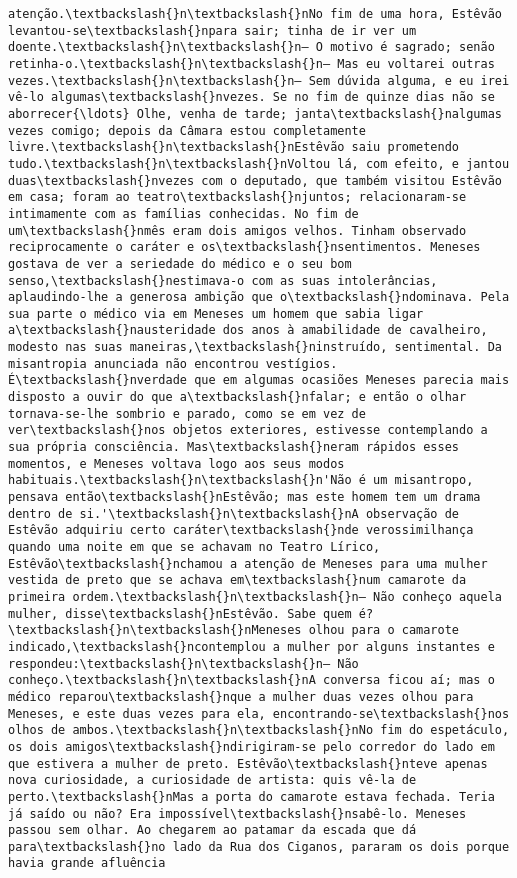 \documentclass[11pt]{article}
\begin{document}
\begin{Verbatim}[commandchars=\\\{\}]
atenção.\textbackslash{}n\textbackslash{}nNo fim de uma hora, Estêvão levantou-se\textbackslash{}npara sair; tinha de ir ver um doente.\textbackslash{}n\textbackslash{}n— O motivo é sagrado; senão retinha-o.\textbackslash{}n\textbackslash{}n— Mas eu voltarei outras vezes.\textbackslash{}n\textbackslash{}n— Sem dúvida alguma, e eu irei vê-lo algumas\textbackslash{}nvezes. Se no fim de quinze dias não se aborrecer{\ldots} Olhe, venha de tarde; janta\textbackslash{}nalgumas vezes comigo; depois da Câmara estou completamente livre.\textbackslash{}n\textbackslash{}nEstêvão saiu prometendo tudo.\textbackslash{}n\textbackslash{}nVoltou lá, com efeito, e jantou duas\textbackslash{}nvezes com o deputado, que também visitou Estêvão em casa; foram ao teatro\textbackslash{}njuntos; relacionaram-se intimamente com as famílias conhecidas. No fim de um\textbackslash{}nmês eram dois amigos velhos. Tinham observado reciprocamente o caráter e os\textbackslash{}nsentimentos. Meneses gostava de ver a seriedade do médico e o seu bom senso,\textbackslash{}nestimava-o com as suas intolerâncias, aplaudindo-lhe a generosa ambição que o\textbackslash{}ndominava. Pela sua parte o médico via em Meneses um homem que sabia ligar a\textbackslash{}nausteridade dos anos à amabilidade de cavalheiro, modesto nas suas maneiras,\textbackslash{}ninstruído, sentimental. Da misantropia anunciada não encontrou vestígios. É\textbackslash{}nverdade que em algumas ocasiões Meneses parecia mais disposto a ouvir do que a\textbackslash{}nfalar; e então o olhar tornava-se-lhe sombrio e parado, como se em vez de ver\textbackslash{}nos objetos exteriores, estivesse contemplando a sua própria consciência. Mas\textbackslash{}neram rápidos esses momentos, e Meneses voltava logo aos seus modos habituais.\textbackslash{}n\textbackslash{}n'Não é um misantropo, pensava então\textbackslash{}nEstêvão; mas este homem tem um drama dentro de si.'\textbackslash{}n\textbackslash{}nA observação de Estêvão adquiriu certo caráter\textbackslash{}nde verossimilhança quando uma noite em que se achavam no Teatro Lírico, Estêvão\textbackslash{}nchamou a atenção de Meneses para uma mulher vestida de preto que se achava em\textbackslash{}num camarote da primeira ordem.\textbackslash{}n\textbackslash{}n— Não conheço aquela mulher, disse\textbackslash{}nEstêvão. Sabe quem é?\textbackslash{}n\textbackslash{}nMeneses olhou para o camarote indicado,\textbackslash{}ncontemplou a mulher por alguns instantes e respondeu:\textbackslash{}n\textbackslash{}n— Não conheço.\textbackslash{}n\textbackslash{}nA conversa ficou aí; mas o médico reparou\textbackslash{}nque a mulher duas vezes olhou para Meneses, e este duas vezes para ela, encontrando-se\textbackslash{}nos olhos de ambos.\textbackslash{}n\textbackslash{}nNo fim do espetáculo, os dois amigos\textbackslash{}ndirigiram-se pelo corredor do lado em que estivera a mulher de preto. Estêvão\textbackslash{}nteve apenas nova curiosidade, a curiosidade de artista: quis vê-la de perto.\textbackslash{}nMas a porta do camarote estava fechada. Teria já saído ou não? Era impossível\textbackslash{}nsabê-lo. Meneses passou sem olhar. Ao chegarem ao patamar da escada que dá para\textbackslash{}no lado da Rua dos Ciganos, pararam os dois porque havia grande afluência 
\end{Verbatim}
\end{document}
